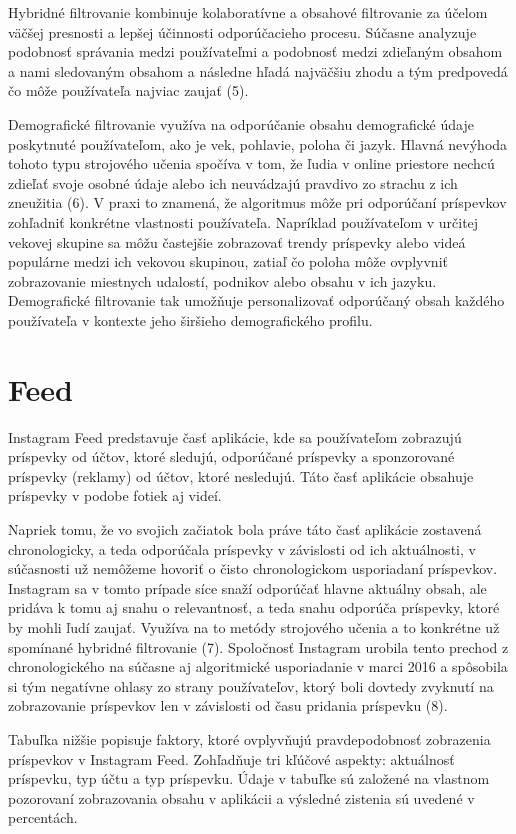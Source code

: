\documentclass[10pt,twoside,slovak,a4paper]{article}
\begin{document}
Hybridné filtrovanie kombinuje kolaboratívne a obsahové filtrovanie za účelom väčšej presnosti a lepšej účinnosti odporúčacieho procesu. Súčasne analyzuje podobnosť správania medzi používateľmi a podobnosť medzi zdieľaným obsahom a nami sledovaným obsahom a následne hľadá najväčšiu zhodu a tým predpovedá čo môže používateľa najviac zaujať (5).

Demografické filtrovanie využíva na odporúčanie obsahu demografické údaje poskytnuté používateľom, ako je vek, pohlavie, poloha či jazyk. Hlavná nevýhoda tohoto typu strojového učenia spočíva v tom, že ľudia v online priestore nechcú zdieľať svoje osobné údaje alebo ich neuvádzajú pravdivo zo strachu z ich zneužitia (6). V praxi to znamená, že algoritmus môže pri odporúčaní príspevkov zohľadniť konkrétne vlastnosti používateľa. Napríklad používateľom v určitej vekovej skupine sa môžu častejšie zobrazovať trendy príspevky alebo videá populárne medzi ich vekovou skupinou, zatiaľ čo poloha môže ovplyvniť zobrazovanie miestnych udalostí, podnikov alebo obsahu v ich jazyku. Demografické filtrovanie tak umožňuje personalizovať odporúčaný obsah každého používateľa v kontexte jeho širšieho demografického profilu.


\section{Feed} \label{tretia}

Instagram Feed predstavuje časť aplikácie, kde sa používateľom zobrazujú príspevky od účtov, ktoré sledujú, odporúčané príspevky a sponzorované príspevky (reklamy) od účtov, ktoré nesledujú. Táto časť aplikácie obsahuje príspevky v podobe fotiek aj videí.

Napriek tomu, že vo svojich začiatok bola práve táto časť aplikácie zostavená chronologicky, a teda odporúčala príspevky v závislosti od ich aktuálnosti, v súčasnosti už nemôžeme hovoriť o čisto chronologickom usporiadaní príspevkov. Instagram sa v tomto prípade síce snaží odporúčať hlavne aktuálny obsah, ale pridáva k tomu aj snahu o relevantnosť, a teda snahu odporúča príspevky, ktoré by mohli ľudí zaujať. Využíva na to metódy strojového učenia a to konkrétne už spomínané hybridné filtrovanie (7). Spoločnosť Instagram urobila tento prechod z chronologického na súčasne aj algoritmické usporiadanie v marci 2016 a spôsobila si tým negatívne ohlasy zo strany používateľov, ktorý boli dovtedy zvyknutí na zobrazovanie príspevkov len v závislosti od času pridania príspevku (8). 

Tabuľka nižšie popisuje faktory, ktoré ovplyvňujú pravdepodobnosť zobrazenia príspevkov v Instagram Feed. Zohľadňuje tri kľúčové aspekty: aktuálnosť príspevku, typ účtu a typ príspevku. Údaje v tabuľke sú založené na vlastnom pozorovaní zobrazovania obsahu v aplikácii a výsledné zistenia sú uvedené v percentách.
\end{document}
